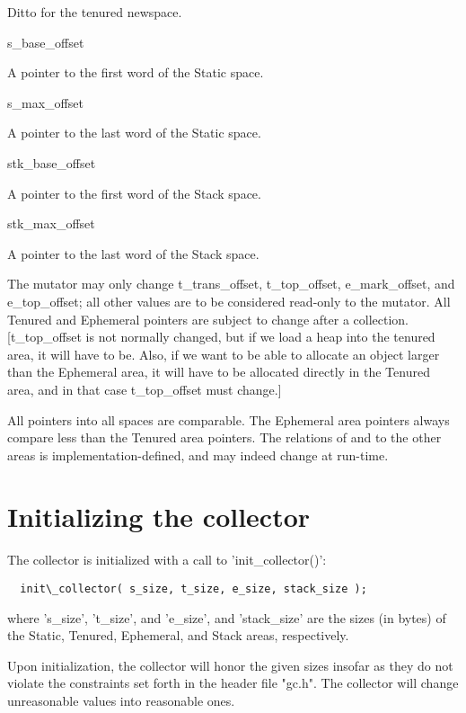 \begin{description}
 Ditto for the tenured newspace.

\item {\sc s\_base\_offset}

 A pointer to the first word of the Static space.

\item {\sc s\_max\_offset}

 A pointer to the last word of the Static space.

\item {\sc stk\_base\_offset}

 A pointer to the first word of the Stack space.

\item {\sc stk\_max\_offset}

  A pointer to the last word of the Stack space.

\end{description}

The mutator may only change {\sc t\_trans\_offset}, {\sc t\_top\_offset},
{\sc e\_mark\_offset}, and {\sc e\_top\_offset}; all other values are to
be considered read-only to the mutator. All Tenured and Ephemeral
pointers are subject to change after a collection. [{\sc t\_top\_offset}
is not normally changed, but if we load a heap into the tenured area,
it will have to be. Also, if we want to be able to allocate an object
larger than the Ephemeral area, it will have to be allocated directly
in the Tenured area, and in that case {\sc t\_top\_offset} must change.]

All pointers into all spaces are comparable. The Ephemeral area pointers
always compare less than the Tenured area pointers. The relations of and to
the other areas is implementation-defined, and may indeed change at run-time.


\section{Initializing the collector}

The collector is initialized with a call to 'init\_collector()':
\begin{verbatim}
  init\_collector( s_size, t_size, e_size, stack_size );
\end{verbatim}
where 's\_size', 't\_size', and 'e\_size', and 'stack\_size' are the sizes (in
bytes) of the Static, Tenured, Ephemeral, and Stack areas, respectively.

Upon initialization, the collector will honor the given sizes insofar as
they do not violate the constraints set forth in the header file "gc.h".
The collector will change unreasonable values into reasonable ones.

